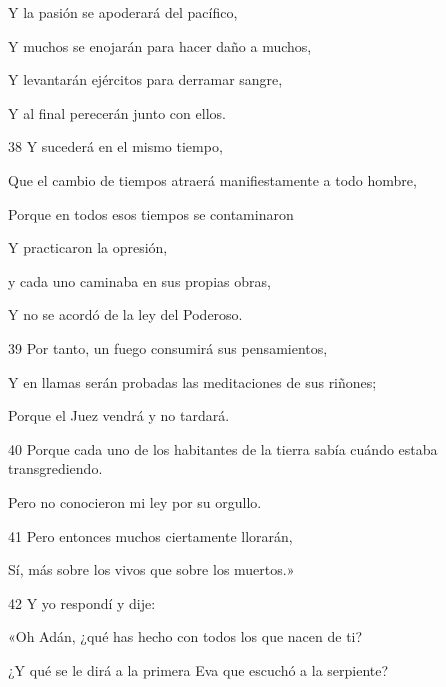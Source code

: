 \par Y la pasión se apoderará del pacífico,

\par Y muchos se enojarán para hacer daño a muchos,

\par Y levantarán ejércitos para derramar sangre,

\par Y al final perecerán junto con ellos.

\par 38 Y sucederá en el mismo tiempo,

\par Que el cambio de tiempos atraerá manifiestamente a todo hombre,

\par Porque en todos esos tiempos se contaminaron

\par Y practicaron la opresión,

\par y cada uno caminaba en sus propias obras,

\par Y no se acordó de la ley del Poderoso.

\par 39 Por tanto, un fuego consumirá sus pensamientos,

\par Y en llamas serán probadas las meditaciones de sus riñones;

\par Porque el Juez vendrá y no tardará.

\par 40 Porque cada uno de los habitantes de la tierra sabía cuándo estaba transgrediendo.

\par Pero no conocieron mi ley por su orgullo.

\par 41 Pero entonces muchos ciertamente llorarán,

\par Sí, más sobre los vivos que sobre los muertos.»

\par 42 Y yo respondí y dije:

\par «Oh Adán, ¿qué has hecho con todos los que nacen de ti?

\par ¿Y qué se le dirá a la primera Eva que escuchó a la serpiente?

